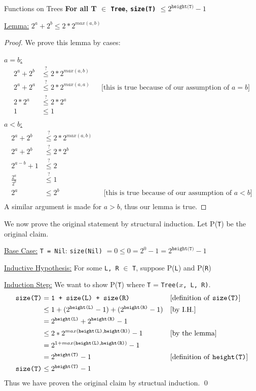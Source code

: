 \documentclass[11pt, nopagenumbers]{adamblan-hw}
\newcommand*{\T}[1]{\texttt{#1}}
\begin{document}
\begin{question}{Functions on Trees}
\textbf{For all T $\in$ \texttt{Tree}, \texttt{size(T)} $\leq 2^{\texttt{height(T)}} - 1$}

\underline{Lemma:} $2^a + 2^b \leq 2 * 2^{max(a, b)}$
\begin{proof}
We prove this lemma by cases:

\underline{$a = b$:}
\vspace{-0.90cm}
\begin{align*}
2^a + 2^b &\stackrel{?}{\leq} 2 * 2^{max(a, b)} \\
2^a + 2^a &\stackrel{?}{\leq} 2 * 2^{max(a, a)} && \text{[this is true because of our assumption of $a = b$]}\\
2 * 2^a &\stackrel{?}{\leq} 2 * 2^{a} \\
1 &\leq 1 \\
\end{align*}
\vspace{-0.90cm}
\underline{$a < b$:}
\begin{align*}
2^a + 2^b &\stackrel{?}{\leq} 2 * 2^{max(a, b)} \\
2^a + 2^b &\stackrel{?}{\leq} 2 * 2^{b} \\
2^{a - b} + 1 &\stackrel{?}{\leq} 2 \\
\frac{2^a}{2^b} &\stackrel{?}{\leq} 1 \\
2^a &\leq 2^b && \text{[this is true because of our assumption of $a < b$]}\\
\end{align*}
A similar argument is made for $a > b$, thus our lemma is true.
\end{proof}
We now prove the original statement by structural induction. Let P(\T{T}) be the original claim.

\underline{Base Case:} \T{T = Nil}: \T{size(Nil)} $=0 \leq 0 = 2^0 - 1 = 2^{\T{height(T)}} - 1$

\underline{Inductive Hypothesis:} For some \texttt{L, R} $\in$ \T{T}, suppose P(\T{L}) and P(\T{R})

\underline{Induction Step:} We want to show P(\T{T}) where \T{T} = \T{Tree($x$, L, R)}.
\begin{align*}
\T{size(T)} &= \T{1 + size(L) + size(R)} && \text{[definition of \T{size(T)}]} \\
&\leq 1 + (2^{\T{height(L)}} - 1) + (2^{\T{height(R)}} - 1) && \text{[by I.H.]} \\
&= 2^{\T{height(L)}} + 2^{\T{height(R)}} - 1 \\
&\leq 2 * 2^{max(\T{height(L)}, \T{height(R)})} - 1 && \text{[by the lemma]}\\
&= 2^{1 + max(\T{height(L)}, \T{height(R)})} - 1 \\
&= 2^{\T{height(T)}} - 1 && \text{[definition of \T{height(T)}]} \\
\T{size(T)} &\leq 2^{\T{height(T)}} - 1 \\
\end{align*}
Thus we have proven the original claim by structual induction. \qed
\end{question}
\end{document}
